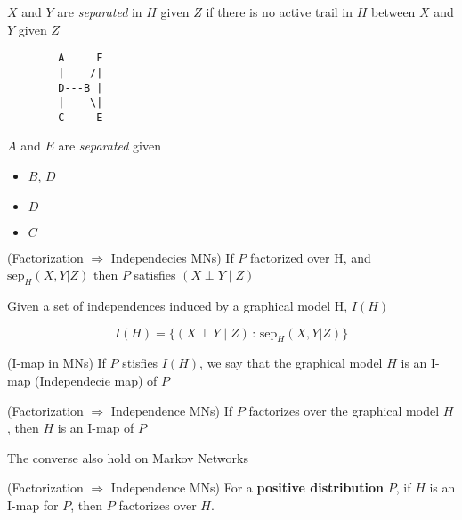 
\begin{definition}
 $X$ and $Y$ are \textit{separated} in $H$ given $Z$ if  there is no active trail in $H$ between $X$ and $Y$ given $Z$
\end{definition}

\vspace{0.3cm}
\begin{paracol}{3}
\centering
\begin{verbatim}
        A     F 
        |    /|
        D---B |
        |    \|  
        C-----E
\end{verbatim}

 \switchcolumn

 $A$ and $E$ are \textit{separated} given
\begin{itemize}
 \item $B$, $D$
 \item $D$
 \item $C$
\end{itemize}
 
\end{paracol}

\begin{theorem}(Factorization $\Rightarrow$ Independecies MNs)
 If $P$ factorized over H, and $\text{sep}_H(X,Y|Z)$ then $P$ satisfies $(X \perp Y \mid Z)$
\end{theorem}

Given a set of independences induced by a graphical model H, $I(H)$

\begin{equation}
 I(H) = \{(X \perp Y \mid Z) \, : \, \text{sep}_H(X,Y|Z) \}
\end{equation}

\begin{definition}(I-map in MNs) If $P$ stisfies $I(H)$, we say that the graphical model $H$ is an I-map (Independecie map) of $P$
\end{definition}

\begin{theorem}(Factorization $\Rightarrow$ Independence MNs)
 If $P$ factorizes over the graphical model $H$, then $H$ is an I-map of $P$
\end{theorem}

The converse also hold on Markov Networks

\begin{theorem}(Factorization $\Rightarrow$ Independence MNs) 
For a \textbf{positive distribution} $P$, if $H$ is an I-map for $P$, then $P$ factorizes over $H$.
\end{theorem}

